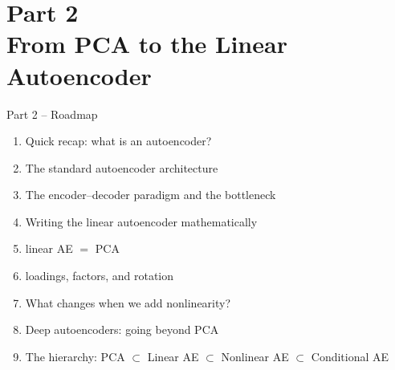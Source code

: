 \documentclass[aspectratio=169]{beamer}
\begin{document}
\section{Part 2\\From PCA to the Linear Autoencoder}
%
\begin{frame}{Part 2 -- Roadmap}
\begin{enumerate}
    \item Quick recap: what is an autoencoder?
    \item The standard autoencoder architecture
    \item The encoder--decoder paradigm and the bottleneck
    \item Writing the linear autoencoder mathematically
    \item linear AE $=$ PCA
    \item loadings, factors, and rotation
    \item What changes when we add nonlinearity?
    \item Deep autoencoders: going beyond PCA
    \item The hierarchy: PCA $\subset$ Linear AE $\subset$ Nonlinear AE $\subset$ Conditional AE
\end{enumerate}
\end{frame}
%
\end{document}
